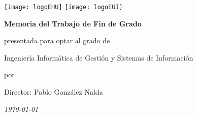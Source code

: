 
\begin{titlepage}
	\texttt{[image: logoEHU]}
	\hspace{\fill}
	\texttt{[image: logoEUI]}
	\vspace{1.5cm}
	\begin{center}
		
		\vspace{0.5cm}
		
		{\Huge \textbf{\thetitle}}
		
		\vspace{3cm}
		
		{\large \textbf{Memoria del Trabajo de Fin de Grado}}
		
		{\normalsize presentada para optar al grado de}
		
		{\Large Ingeniería Informática de Gestión y Sistemas de Información}
		
		{\normalsize por}

		\LARGE{\theauthor}
		
		\vspace{1cm}
		
		{\large Director: Pablo González Nalda}
		
		\vspace{2cm}
		
		{\Large\textit{\today}}

	\end{center}
\end{titlepage}

